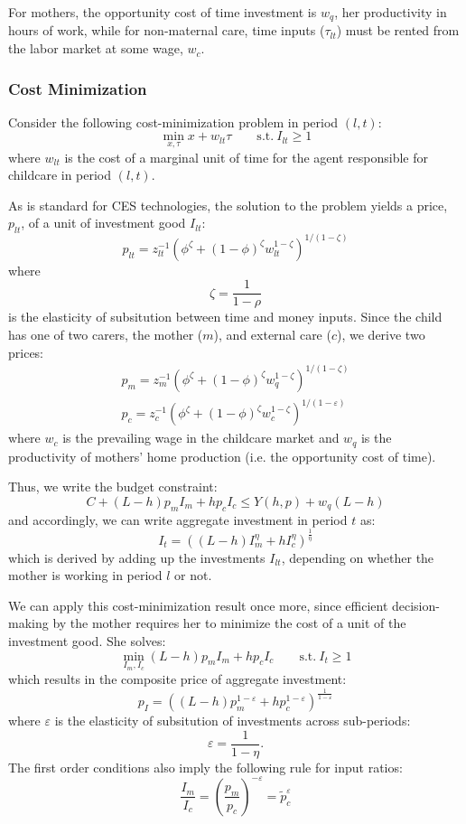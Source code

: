 \documentclass[12pt]{article}
\numberwithin{equation}{section}
\numberwithin{figure}{section}
\numberwithin{table}{section}
\begin{document}
For mothers, the opportunity cost of time investment is $w_{q}$, her productivity in hours of work, while for non-maternal care, time inputs ($\tau_{lt}$) must be rented from the labor market at some wage, $w_c$.

\subsubsection{Cost Minimization}
Consider the following cost-minimization problem in period $(l,t)$:
\[\min_{x,\tau}x+w_{lt}\tau\qquad\text{s.t.}\ I_{lt}\geq 1 \]
where $w_{lt}$ is the cost of a marginal unit of time for the agent responsible for childcare in period $(l,t)$.

As is standard for CES technologies, the solution to the problem yields a price, $p_{lt}$, of a unit of investment good $I_{lt}$:
\[p_{lt} = z^{-1}_{lt}\left(\phi^\zeta + (1-\phi)^\zeta w_{lt}^{1-\zeta}\right)^{1/(1-\zeta)} \]
where
\[ \zeta = \frac{1}{1-\rho} \]
is the elasticity of subsitution between time and money inputs. Since the child has one of two carers, the mother ($m$), and external care ($c$), we derive two prices:
\begin{eqnarray}
p_m = z_m^{-1}\left(\phi^\zeta + (1-\phi)^\zeta w_q^{1-\zeta}\right)^{1/(1-\zeta)} \\
p_c = z_c^{-1}\left(\phi^\zeta + (1-\phi)^\zeta w_c^{1-\zeta}\right)^{1/(1-\varepsilon)}
\end{eqnarray}
where $w_c$ is the prevailing wage in the childcare market and $w_q$ is the productivity of mothers' home production (i.e. the opportunity cost of time).

Thus, we write the budget constraint:
\[ C + (L-h)p_mI_m + hp_cI_c \leq Y(h,p) + w_q(L-h) \]
and accordingly, we can write aggregate investment in period $t$ as:
\[ I_t = \left((L-h)I_m^\eta + hI_c^\eta\right)^{\frac{1}{\eta}} \]
which is derived by adding up the investments $I_{lt}$, depending on whether the mother is working in period $l$ or not.

We can apply this cost-minimization result once more, since efficient decision-making by the mother requires her to minimize the cost of a unit of the investment good. She solves:
\[ \min_{I_m,I_c}(L-h)p_mI_m + hp_cI_c\qquad\text{s.t.}\ I_t\geq 1 \]
which results in the composite price of aggregate investment:
\[p_I = \left((L-h)p_m^{1-\varepsilon}+hp_c^{1-\varepsilon}\right)^{\frac{1}{1-\varepsilon}} \]
where $\varepsilon$ is the elasticity of subsitution of investments across sub-periods:
\[\varepsilon = \frac{1}{1-\eta}.\]
The first order conditions also imply the following rule for input ratios:
\[\frac{I_m}{I_c} = \left(\frac{p_m}{p_c}\right)^{-\varepsilon} = \tilde{p}_c^{\varepsilon} \]
\end{document}
